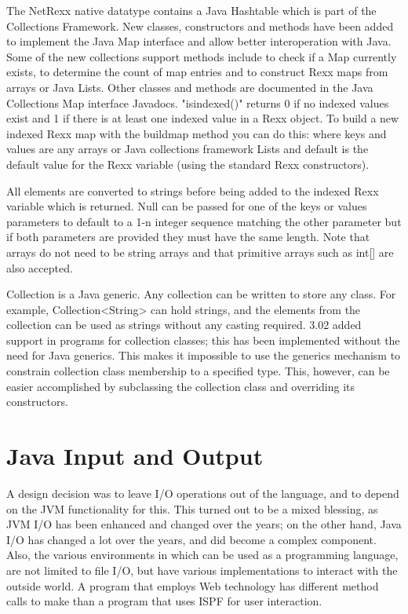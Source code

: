 {The NetRexx native \Rexx{} datatype contains a Java Hashtable which is
part of the Collections Framework. New classes, constructors and
methods have been added to implement the Java Map interface and allow
better interoperation with Java. Some of the new collections support
methods include  to check if a Map currently exists,
 to determine the count of map entries and
 to construct Rexx maps from arrays or
Java Lists. Other classes and methods are documented in the Java
Collections Map interface Javadocs. "isindexed()" returns 0 if no
indexed values exist and 1 if there is at least one indexed value in a
Rexx object. To build a new indexed Rexx map with the buildmap method
you can do this:  where
keys and values are any arrays or Java collections framework Lists and
default is the default value for the Rexx variable (using the standard
Rexx constructors). 

All elements are converted to strings before being added to the indexed Rexx variable which is returned. Null can be passed for one of the keys or values parameters to default to a 1-n integer sequence matching the other parameter but if both parameters are provided they must have the same length. Note that arrays do not need to be string arrays and that primitive arrays such as int[] are also accepted.
\begin{shaded}
Collection is a Java generic. Any collection can be written to store any
class. For example, Collection<String> can hold strings, and the
elements from the collection can be used as strings without any
casting required. \nr{} 3.02 added  support in
\nr{} programs for collection classes; this has been implemented
without the need for Java generics. This makes it impossible to use
the generics mechanism to constrain collection class membership to a
specified type. This, however, can be easier accomplished by
subclassing the collection class and overriding its constructors.
\end{shaded}


 
\chapter{Java Input and Output}
A \nr{} design decision was to leave I/O operations out of the
language, and to depend on the JVM functionality for this. This
turned out to be a mixed blessing, as JVM I/O has been enhanced and
changed over the years; on the other hand, Java I/O has changed a lot
over the years, and did become a complex component. Also, the various environments in which \nr{}
can be used as a programming language, are not limited to file I/O,
but have various implementations to interact with the outside world. A
\nr{} program that employs Web technology has different method calls
to make than a program that uses ISPF for user interaction.

}
